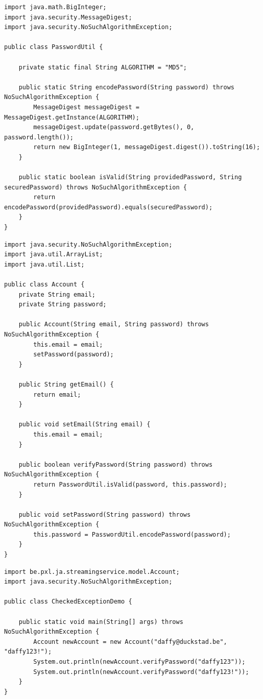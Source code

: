 \begin{itemize}
{\begin{lstlisting}
import java.math.BigInteger;
import java.security.MessageDigest;
import java.security.NoSuchAlgorithmException;

public class PasswordUtil {

	private static final String ALGORITHM = "MD5";

	public static String encodePassword(String password) throws NoSuchAlgorithmException {
		MessageDigest messageDigest = MessageDigest.getInstance(ALGORITHM);
		messageDigest.update(password.getBytes(), 0, password.length());
		return new BigInteger(1, messageDigest.digest()).toString(16);
	}

	public static boolean isValid(String providedPassword, String securedPassword) throws NoSuchAlgorithmException {
		return encodePassword(providedPassword).equals(securedPassword);
	}
}
\end{lstlisting}

\begin{lstlisting}
import java.security.NoSuchAlgorithmException;
import java.util.ArrayList;
import java.util.List;

public class Account {
	private String email;
	private String password;

	public Account(String email, String password) throws NoSuchAlgorithmException {
		this.email = email;
		setPassword(password);
	}

	public String getEmail() {
		return email;
	}

	public void setEmail(String email) {
		this.email = email;
	}

	public boolean verifyPassword(String password) throws NoSuchAlgorithmException {
		return PasswordUtil.isValid(password, this.password);
	}

	public void setPassword(String password) throws NoSuchAlgorithmException {
		this.password = PasswordUtil.encodePassword(password);
	}
}
\end{lstlisting}

\begin{lstlisting}
import be.pxl.ja.streamingservice.model.Account;
import java.security.NoSuchAlgorithmException;

public class CheckedExceptionDemo {

	public static void main(String[] args) throws NoSuchAlgorithmException {
		Account newAccount = new Account("daffy@duckstad.be", "daffy123!");
		System.out.println(newAccount.verifyPassword("daffy123"));
		System.out.println(newAccount.verifyPassword("daffy123!"));
	}
}
\end{lstlisting}

}
\end{itemize}
